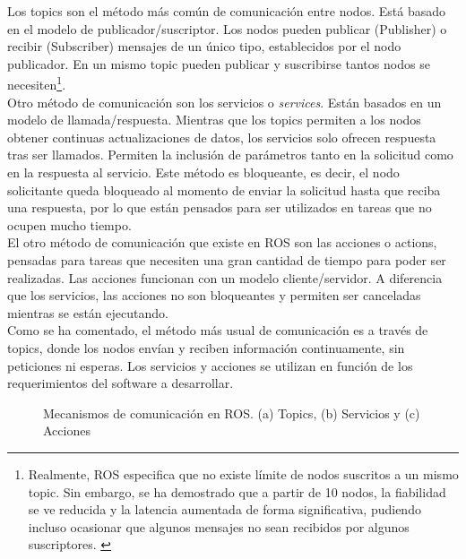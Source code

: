 Los topics son el método más común de comunicación entre nodos. Está basado en el modelo de publicador/suscriptor. Los nodos pueden publicar (Publisher) o recibir (Subscriber) mensajes de un único tipo, establecidos por el nodo publicador. En un mismo topic pueden publicar y suscribirse tantos nodos se necesiten\footnote{Realmente, ROS especifica que no existe límite de nodos suscritos a un mismo topic. Sin embargo, se ha demostrado que a partir de 10 nodos, la fiabilidad se ve reducida y la latencia aumentada de forma significativa, pudiendo incluso ocasionar que algunos mensajes no sean recibidos por algunos suscriptores. \cite{issue}}. \\

Otro método de comunicación son los servicios o \textit{services}. Están basados en un modelo de llamada/respuesta. Mientras que los topics permiten a los nodos obtener continuas actualizaciones de datos, los servicios solo ofrecen respuesta tras ser llamados. Permiten la inclusión de parámetros tanto en la solicitud como en la respuesta al servicio. Este método es bloqueante, es decir, el nodo solicitante queda bloqueado al momento de enviar la solicitud hasta que reciba una respuesta, por lo que están pensados para ser utilizados en tareas que no ocupen mucho tiempo.\\

El otro método de comunicación que existe en ROS son las acciones o actions, pensadas para tareas que necesiten una gran cantidad de tiempo para poder ser realizadas. Las acciones funcionan con un modelo cliente/servidor. A diferencia que los servicios, las acciones no son bloqueantes y permiten ser canceladas mientras se están ejecutando.\\

Como se ha comentado, el método más usual de comunicación es a través de topics, donde los nodos envían y reciben información continuamente, sin peticiones ni esperas. Los servicios y acciones se utilizan en función de los requerimientos del software a desarrollar.\\

\begin{figure}[H]
 \centering
  \hspace{0.5cm}
 \caption{Mecanismos de comunicación en ROS. (a) Topics, (b) Servicios y (c) Acciones}
 \label{fig:comm}
\end{figure}

